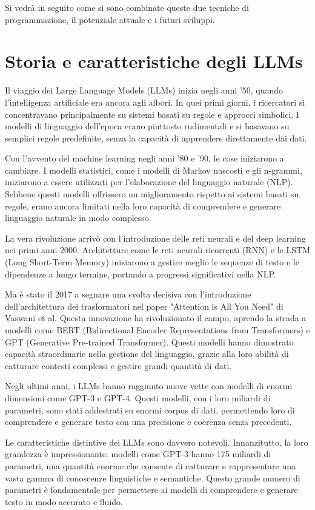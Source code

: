 \documentclass[a4paper,twoside,12pt]{toptesi}
\begin{document}
Si vedrà in seguito come si sono combinate queste due tecniche di programmazione, il potenziale attuale e i futuri sviluppi.

\section{Storia e caratteristiche degli LLMs}
Il viaggio dei Large Language Models (LLMs) inizia negli anni ’50, quando l'intelligenza artificiale era ancora agli albori. In quei primi giorni, i ricercatori si concentravano principalmente su sistemi basati su regole e approcci simbolici. I modelli di linguaggio dell'epoca erano piuttosto rudimentali e si basavano su semplici regole predefinite, senza la capacità di apprendere direttamente dai dati.

Con l'avvento del machine learning negli anni '80 e '90, le cose iniziarono a cambiare. I modelli statistici, come i modelli di Markov nascosti e gli n-grammi, iniziarono a essere utilizzati per l'elaborazione del linguaggio naturale (NLP). Sebbene questi modelli offrissero un miglioramento rispetto ai sistemi basati su regole, erano ancora limitati nella loro capacità di comprendere e generare linguaggio naturale in modo complesso.

La vera rivoluzione arrivò con l'introduzione delle reti neurali e del deep learning nei primi anni 2000. Architetture come le reti neurali ricorrenti (RNN) e le LSTM (Long Short-Term Memory) iniziarono a gestire meglio le sequenze di testo e le dipendenze a lungo termine, portando a progressi significativi nella NLP.

Ma è stato il 2017 a segnare una svolta decisiva con l'introduzione dell'architettura dei trasformatori nel paper "Attention is All You Need" di Vaswani et al. Questa innovazione ha rivoluzionato il campo, aprendo la strada a modelli come BERT (Bidirectional Encoder Representations from Transformers) e GPT (Generative Pre-trained Transformer). Questi modelli hanno dimostrato capacità straordinarie nella gestione del linguaggio, grazie alla loro abilità di catturare contesti complessi e gestire grandi quantità di dati.

Negli ultimi anni, i LLMs hanno raggiunto nuove vette con modelli di enormi dimensioni come GPT-3 e GPT-4. Questi modelli, con i loro miliardi di parametri, sono stati addestrati su enormi corpus di dati, permettendo loro di comprendere e generare testo con una precisione e coerenza senza precedenti.

Le caratteristiche distintive dei LLMs sono davvero notevoli. Innanzitutto, la loro grandezza è impressionante: modelli come GPT-3 hanno 175 miliardi di parametri, una quantità enorme che consente di catturare e rappresentare una vasta gamma di conoscenze linguistiche e semantiche. Questo grande numero di parametri è fondamentale per permettere ai modelli di comprendere e generare testo in modo accurato e fluido.
\end{document}
